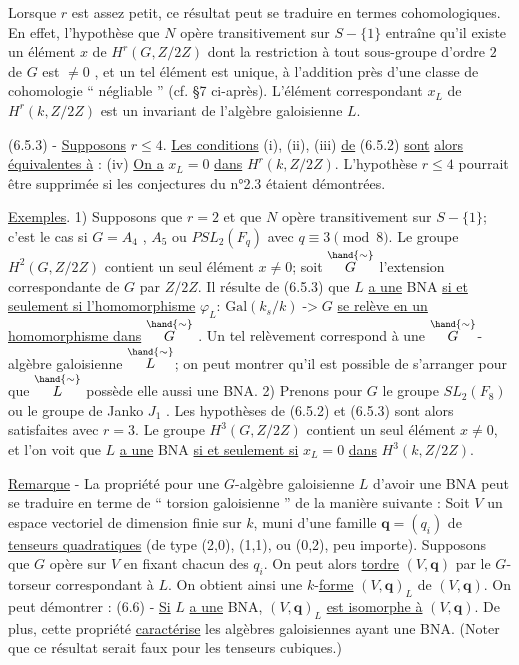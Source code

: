 
Lorsque $r$ est assez petit, ce résultat peut se traduire en termes
cohomologiques. En effet, l'hypothèse que $N$ opère transitivement sur
$S - \{1\}$ entraîne qu'il existe un élément $x$ de $H^{r}(G, Z/2Z)$ dont la
restriction à tout sous-groupe d'ordre $2$ de $G$ est $\neq 0$ , et un tel élément
est unique, à l'addition près d'une classe de cohomologie `` négliable ''
(cf. §7 ci-après). L'élément correspondant $x_{L}$ de $H^{r}(k, Z/2Z)$ est un
invariant de l'algèbre galoisienne $L$.

(6.5.3) - \uline{Supposons} $r \leq 4$. \uline{Les conditions} (i), (ii), (iii) \uline{de} (6.5.2) \uline{sont}
\uline{alors équivalentes à} :
(iv) \uline{On a} $x_{L} = 0$ \uline{dans} $H^{r}(k, Z/2Z)$.
L'hypothèse $r \leq 4$ pourrait être supprimée si les conjectures du n°2.3
étaient démontrées.

\uline{Exemples}. 1) Supposons que $r = 2$ et que $N$ opère transitivement sur
$S - \{1\}$; c'est le cas si $G = A_{4}$ , $A_{5}$ ou $PSL_{2}(F_{q})$ avec $q \equiv 3 \pmod{8}$.
Le groupe $H^{2}(G, Z/2Z)$ contient un seul élément $x \neq 0$; soit $\overset{\hand{\sim}}{G}$ l'extension
correspondante de $G$ par $Z/2Z$. Il résulte de (6.5.3) que $L$ \uline{a une} BNA
\uline{si et seulement si l'homomorphisme} $\varphi_{L}$: $\mathrm{Gal}(k_{s}/k) \;\text{->}\; G$ \uline{se relève en un}
\uline{homomorphisme dans} $\overset{\hand{\sim}}{G}$ . Un tel relèvement correspond à une $\overset{\hand{\sim}}{G}$-algèbre
galoisienne $\overset{\hand{\sim}}{L}$; on peut montrer qu'il est possible de s'arranger pour que
$\overset{\hand{\sim}}{L}$ possède elle aussi une BNA.
2) Prenons pour $G$ le groupe $SL_{2}(F_{8})$ ou le groupe de Janko $J_{1}$ . Les
hypothèses de (6.5.2) et (6.5.3) sont alors satisfaites avec $r = 3$.
Le groupe $H^{3}(G, Z/2Z)$ contient un seul élément $x \neq 0$, et l'on voit que
$L$ \uline{a une} BNA \uline{si et seulement si} $x_{L} = 0$ \uline{dans} $H^{3}(k, Z/2Z)$.

\uline{Remarque} - La propriété pour une $G$-algèbre galoisienne $L$ d'avoir une BNA
peut se traduire en terme de `` torsion galoisienne '' de la manière suivante :
Soit $V$ un espace vectoriel de dimension finie sur $k$, muni d'une famille
$\mathbf{q} = (q_{i})$ de \uline{tenseurs quadratiques} (de type (2,0), (1,1), ou (0,2), peu
importe). Supposons que $G$ opère sur $V$ en fixant chacun des $q_{i}$. On peut alors
\uline{tordre} $(V,\mathbf{q})$ par le $G$-torseur correspondant à $L$. On obtient ainsi une
$k$-\uline{forme} $(V,\mathbf{q})_{L}$ de $(V,\mathbf{q})$. On peut démontrer :
(6.6) - \uline{Si} $L$ \uline{a une} BNA, $(V,\mathbf{q})_{L}$ \uline{est isomorphe à} $(V,\mathbf{q})$.
De plus, cette propriété \uline{caractérise} les algèbres galoisiennes ayant une
BNA.
(Noter que ce résultat serait faux pour les tenseurs cubiques.)

